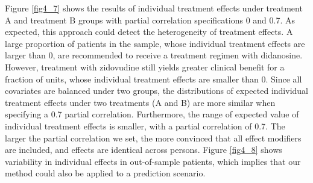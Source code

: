 	Figure \ref{fig4_7} shows the results of individual treatment effects under treatment A and treatment B groups with partial correlation specifications 0 and 0.7. As expected, this approach could detect the heterogeneity of treatment effects. A large proportion of patients in the sample, whose individual treatment effects are larger than 0, are recommended to receive a treatment regimen with didanosine. However, treatment with zidovudine still yields greater clinical benefit for a fraction of units, whose individual treatment effects are smaller than 0. Since all covariates are balanced under two groups, the distributions of expected individual treatment effects under two treatments (A and B) are more similar when specifying a 0.7 partial correlation. Furthermore, the range of expected value of individual treatment effects is smaller, with a partial correlation of 0.7. The larger the partial correlation we set, the more convinced that all effect modifiers are included, and effects are identical across persons. Figure \ref{fig4_8} shows variability in individual effects in out-of-sample patients, which implies that our method could also be applied to a prediction scenario. 
